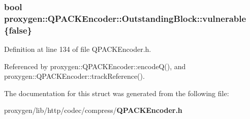 \subsubsection[{vulnerable}]{\setlength{\rightskip}{0pt plus 5cm}bool proxygen\+::\+Q\+P\+A\+C\+K\+Encoder\+::\+Outstanding\+Block\+::vulnerable \{false\}}\label{structproxygen_1_1QPACKEncoder_1_1OutstandingBlock_a3a43d28f131a558a0523f75013dcb659}


Definition at line 134 of file Q\+P\+A\+C\+K\+Encoder.\+h.



Referenced by proxygen\+::\+Q\+P\+A\+C\+K\+Encoder\+::encode\+Q(), and proxygen\+::\+Q\+P\+A\+C\+K\+Encoder\+::track\+Reference().



The documentation for this struct was generated from the following file\+:\begin{DoxyCompactItemize}
\item 
proxygen/lib/http/codec/compress/{\bf Q\+P\+A\+C\+K\+Encoder.\+h}\end{DoxyCompactItemize}
